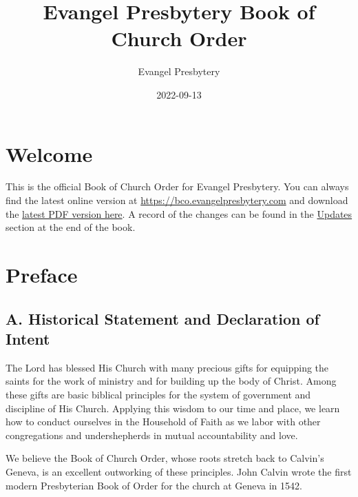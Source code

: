 \documentclass[
]{book}
\title{Evangel Presbytery Book of Church Order}
\author{Evangel Presbytery}
\date{2022-09-13}
\begin{document}
\maketitle



{
\hypersetup{linkcolor=}
\setcounter{tocdepth}{1}
\tableofcontents
}
\hypertarget{welcome}{%
\chapter*{Welcome}\label{welcome}}

This is the official Book of Church Order for Evangel Presbytery. You can always find the latest online version at \url{https://bco.evangelpresbytery.com} and download the \href{https://bco.evangelpresbytery.com/evangel-presbytery-bco.pdf}{latest PDF version here}. A record of the changes can be found in the \href{https://bco.evangelpresbytery.com/updates.html}{Updates} section at the end of the book.

\mainmatter

\hypertarget{preface}{%
\chapter*{Preface}\label{preface}}

\protect\hypertarget{front-matter-preface}{\href{}{}}

\hypertarget{a.-historical-statement-and-declaration-of-intent}{%
\section*{A. Historical Statement and Declaration of Intent}\label{a.-historical-statement-and-declaration-of-intent}}

The Lord has blessed His Church with many precious gifts for equipping the saints for the work of ministry and for building up the body of Christ. Among these gifts are basic biblical principles for the system of government and discipline of His Church. Applying this wisdom to our time and place, we learn how to conduct ourselves in the Household of Faith as we labor with other congregations and undershepherds in mutual accountability and love.

We believe the Book of Church Order, whose roots stretch back to Calvin's Geneva, is an excellent outworking of these principles. John Calvin wrote the first modern Presbyterian Book of Order for the church at Geneva in 1542.
\end{document}
